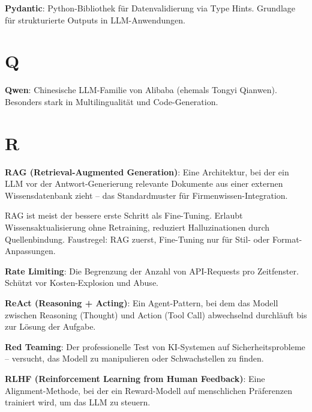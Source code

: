 \textbf{Pydantic}\hspace{0pt}: Python-Bibliothek für Datenvalidierung via Type Hints. Grundlage für strukturierte Outputs in LLM-Anwendungen.

\section{Q}

\textbf{Qwen}\hspace{0pt}: Chinesische LLM-Familie von Alibaba (ehemals Tongyi Qianwen). Besonders stark in Multilingualität und Code-Generation.

\section{R}

\textbf{RAG (Retrieval-Augmented Generation)}\hspace{0pt}: Eine Architektur, bei der ein LLM vor der Antwort-Generierung relevante Dokumente aus einer externen Wissensdatenbank zieht -- das Standardmuster für Firmenwissen-Integration.




\par\mbox{}\par
\begin{praxishinweisEnv}
RAG ist meist der bessere erste Schritt als Fine-Tuning. Erlaubt Wissensaktualisierung ohne Retraining, reduziert Halluzinationen durch Quellenbindung. Faustregel: RAG zuerst, Fine-Tuning nur für Stil- oder Format-Anpassungen.
\end{praxishinweisEnv}

\textbf{Rate Limiting}\hspace{0pt}: Die Begrenzung der Anzahl von API-Requests pro Zeitfenster. Schützt vor Kosten-Explosion und Abuse.

\textbf{ReAct (Reasoning + Acting)}\hspace{0pt}: Ein Agent-Pattern, bei dem das Modell zwischen Reasoning (Thought) und Action (Tool Call) abwechselnd durchläuft bis zur Lösung der Aufgabe.

\textbf{Red Teaming}\hspace{0pt}: Der professionelle Test von KI-Systemen auf Sicherheitsprobleme -- versucht, das Modell zu manipulieren oder Schwachstellen zu finden.

\textbf{RLHF (Reinforcement Learning from Human Feedback)}\hspace{0pt}: Eine Alignment-Methode, bei der ein Reward-Modell auf menschlichen Präferenzen trainiert wird, um das LLM zu steuern.

